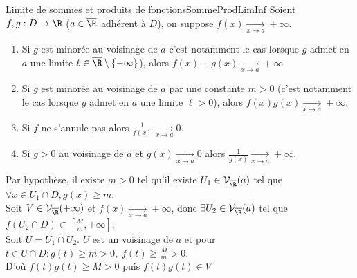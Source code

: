 \documentclass[12pt,a4paper]{report}
\begin{document}
\begin{theoreme}{Limite de sommes et produits de fonctions}{SommeProdLimInf}
Soient $f,g : D \to \R$ ($a \in \overline{\R}$ adhérent à $D$), on suppose $f(x) \xrightarrow[x \to a]{} +\infty$.
\begin{enumerate}
	\item Si $g$ est minorée au voisinage de $a$ c'est notamment le cas lorsque $g$ admet en $a$ une limite $\ell \in \overline{\R} \setminus \{-\infty\}$), alors $f(x)+g(x) \xrightarrow[x \to a]{} +\infty$
	\item Si $g$ est minorée au voisinage de $a$ par une constante $m > 0$ (c'est notamment le cas lorsque $g$ admet en $a$ une limite $\ell > 0$), alors $f(x)g(x) \xrightarrow[x \to a]{} +\infty$.
	\item Si $f$ ne s'annule pas alors $\frac{1}{f(x)} \xrightarrow[x \to a]{} 0$.
	\item Si $g > 0$ au voisinage de $a$ et $g(x) \xrightarrow[x \to a]{} 0$ alors $\frac{1}{g(x)} \xrightarrow[x \to a]{} +\infty$.
\end{enumerate}
\end{theoreme}

\begin{demo}
Par hypothèse, il existe $m > 0$ tel qu'il existe $U_1 \in \mathcal{V}_{\overline{\R}} (a)$ tel que $\forall x \in U_1 \cap D, g(x) \geq m$. \\
Soit $V \in \mathcal{V}_{\overline{\R}} (+\infty)$ et $f(x) \xrightarrow[x \to a]{} +\infty$, donc $\exists U_2 \in \mathcal{V}_{\overline{\R}}(a)$ tel que $f(U_2 \cap D) \subset [\frac{M}{m},+\infty]$. \\
Soit $U = U_1 \cap U_2$. $U$ est un voisinage de $a$ et pour $t \in U \cap D : g(t) \geq m > 0, \; f(t) \geq \frac{M}{m} > 0$. \\
D'où $f(t)g(t) \geq M > 0$ puis $f(t)g(t) \in V$
\end{demo}
\end{document}
